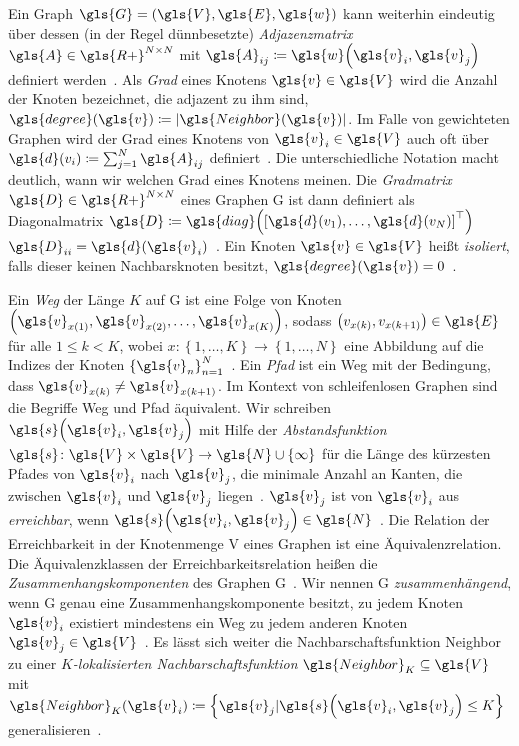 Ein Graph $\gls{G} = \left(\gls{V}, \gls{E}, \gls{w}\right)$ kann weiterhin eindeutig über dessen (in der Regel dünnbesetzte) \emph{Adjazenzmatrix} $\gls{A} \in \gls{R+}^{N \times N}$ mit $\gls{A}_{ij} \coloneqq \gls{w}\left(\gls{v}_i, \gls{v}_j\right)$ definiert werden~\cite{Defferrard}.
Als \emph{Grad} eines Knotens $\gls{v} \in \gls{V}$ wird die Anzahl der Knoten bezeichnet, die adjazent zu ihm sind, \dhe{} $\gls{degree}\left(\gls{v}\right) \coloneqq \left|\gls{Neighbor}\left(\gls{v}\right)\right|$.
Im Falle von gewichteten Graphen wird der Grad eines Knotens von $\gls{v}_i \in \gls{V}$ auch oft über $\gls{d}\left(v_i\right) \coloneqq \sum^N_{j=1} \gls{A}_{ij}$ definiert~\cite{Defferrard}.
Die unterschiedliche Notation macht deutlich, wann wir welchen Grad eines Knotens meinen.
Die \emph{Gradmatrix} $\gls{D} \in \gls{R+}^{N \times N}$ eines Graphen \gls{G} ist dann definiert als Diagonalmatrix $\gls{D} \coloneqq \gls{diag}\left( {\left[ \gls{d}\left(v_1\right), \ldots, \gls{d}\left(v_N\right) \right]}^{\top} \right)$ \bzw{} $\gls{D}_{ii} = \gls{d}\left(\gls{v}_i\right)$~\cite{Defferrard}.
Ein Knoten $\gls{v} \in \gls{V}$ heißt \emph{isoliert}, falls dieser keinen Nachbarsknoten besitzt, \dhe{} $\gls{degree}\left(\gls{v}\right) = 0$~\cite{Defferrard}.

Ein \emph{Weg} der Länge $K$ auf \gls{G} ist eine Folge von Knoten $\left(\gls{v}_{x\left(1\right)}, \gls{v}_{x\left(2\right)}, \ldots, \gls{v}_{x\left(K\right)}\right)$, sodass $\left(v_{x\left(k\right)}, v_{x\left(k+1\right)}\right) \in \gls{E}$ für alle $1 \leq k < K$, wobei $x \colon \left\{ 1, \ldots, K \right\} \to \left\{ 1, \ldots, N \right\}$ eine Abbildung auf die Indizes der Knoten ${\left\{ \gls{v}_n \right\}}^N_{n=1}$~\cite{Biggs}.
Ein \emph{Pfad} ist ein Weg mit der Bedingung, dass $\gls{v}_{x\left(k\right)} \neq \gls{v}_{x\left(k+1\right)}$.
Im Kontext von schleifenlosen Graphen sind die Begriffe Weg und Pfad äquivalent.
Wir schreiben $\gls{s}\left(\gls{v}_i, \gls{v}_j\right)$ mit Hilfe der \emph{Abstandsfunktion} $\gls{s} \colon \gls{V} \times \gls{V} \to \gls{N} \cup \left\{\infty\right\}$ für die Länge des kürzesten Pfades von $\gls{v}_i$ nach $\gls{v}_j$, \dhe{} die minimale Anzahl an Kanten, die zwischen $\gls{v}_i$ und $\gls{v}_j$ liegen~\cite{Hammond}.
$\gls{v}_j$ ist von $\gls{v}_i$ aus \emph{erreichbar}, wenn $\gls{s}\left(\gls{v}_i, \gls{v}_j\right) \in \gls{N}$~\cite{Biggs}.
Die Relation der Erreichbarkeit in der Knotenmenge \gls{V} eines Graphen ist eine Äquivalenzrelation.
Die Äquivalenzklassen der Erreichbarkeitsrelation heißen die \emph{Zusammenhangskomponenten} des Graphen \gls{G}~\cite{Biggs}.
Wir nennen \gls{G} \emph{zusammenhängend}, wenn \gls{G} genau eine Zusammenhangskomponente besitzt, \dhe{} zu jedem Knoten $\gls{v}_i$ existiert mindestens ein Weg zu jedem anderen Knoten $\gls{v}_j \in \gls{V}$~\cite{Hammond}.
Es lässt sich weiter die Nachbarschaftsfunktion \gls{Neighbor} zu einer \emph{$K$-lokalisierten Nachbarschaftsfunktion} $\gls{Neighbor}_K \subseteq \gls{V}$ mit $\gls{Neighbor}_K\left(\gls{v}_i\right) \coloneqq \left\{ \gls{v}_j | \gls{s}\left(\gls{v}_i, \gls{v}_j\right) \leq K \right\}$ generalisieren~\cite{Hammond}.

